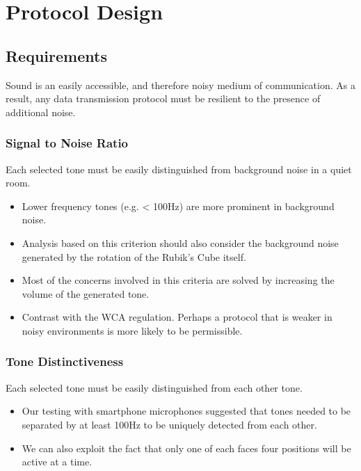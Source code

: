 
\chapter{Protocol Design} %

\label{Chapter4} %


\section{Requirements}

Sound is an easily accessible, and therefore noisy medium of communication. As a result, any data transmission protocol must be resilient to the presence of additional noise.

\subsection{Signal to Noise Ratio}
Each selected tone must be easily distinguished from background noise in a quiet room.
\begin{itemize}
    \item Lower frequency tones (e.g. < 100Hz) are more prominent in background noise.
    \item Analysis based on this criterion should also consider the background noise generated by the rotation of the Rubik's Cube itself.
    \item Most of the concerns involved in this criteria are solved by increasing the volume of the generated tone.
    \item Contrast with the WCA regulation. Perhaps a protocol that is weaker in noisy environments is more likely to be permissible.
\end{itemize}

\subsection{Tone Distinctiveness}
Each selected tone must be easily distinguished from each other tone. 
\begin{itemize}
    \item Our testing with smartphone microphones suggested that tones needed to be separated by at least 100Hz to be uniquely detected from each other.
    \item We can also exploit the fact that only one of each faces four positions will be active at a time.
\end{itemize}

